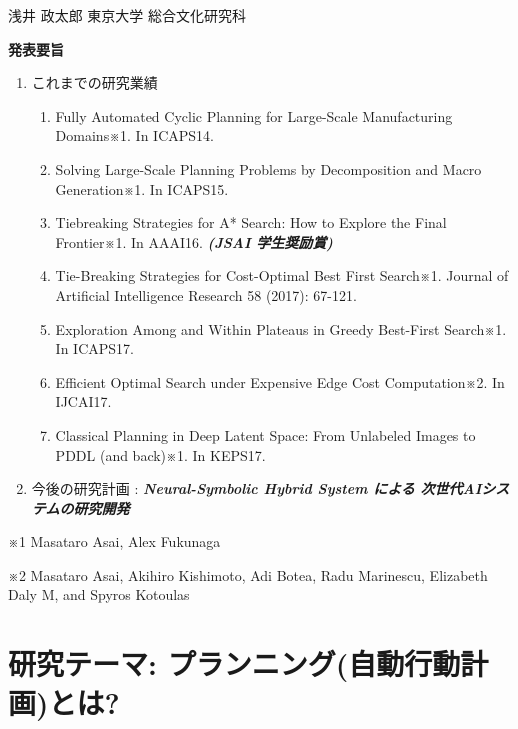 




\begin{outline-text-1}
\begin{center}
浅井 政太郎 東京大学 総合文化研究科
\end{center}

\textbf{発表要旨}

\begin{expanded}
\begin{enumerate}
\item これまでの研究業績
\begin{enumerate}
\item Fully Automated Cyclic Planning for Large-Scale Manufacturing Domains※1. In ICAPS14.
\item Solving Large-Scale Planning Problems by Decomposition and Macro Generation※1. In ICAPS15.
\item Tiebreaking Strategies for A* Search: How to Explore the Final Frontier※1. In AAAI16. \textbf{\emph{(JSAI 学生奨励賞)}}
\item Tie-Breaking Strategies for Cost-Optimal Best First Search※1. Journal of Artificial Intelligence Research 58 (2017): 67-121.
\item Exploration Among and Within Plateaus in Greedy Best-First Search※1. In ICAPS17.
\item Efficient Optimal Search under Expensive Edge Cost Computation※2. In IJCAI17.
\item Classical Planning in Deep Latent Space: From Unlabeled Images to PDDL (and back)※1. In KEPS17.
\end{enumerate}
\item 今後の研究計画 : \textbf{\emph{Neural-Symbolic Hybrid System による 次世代AIシステムの研究開発}}
\end{enumerate}
\end{expanded}

\begin{smaller}
※1 Masataro Asai, Alex Fukunaga

※2 Masataro Asai, Akihiro Kishimoto, Adi Botea, Radu Marinescu, Elizabeth Daly M, and Spyros Kotoulas
\end{smaller}
\end{outline-text-1}

\section{研究テーマ: プランニング(自動行動計画)とは?}
\label{sec-1}



